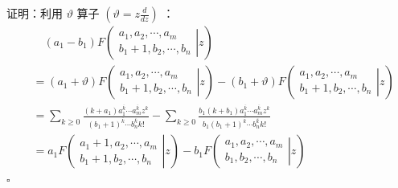 证明：利用 \( \vartheta \) 算子 \( (\vartheta = z \frac{d}{dz}) \) ：
\begin{align*}
  & \quad (a_1 - b_1) F
  \left( \left.
    \begin{array}{cccc}
      a_1, a_2, \cdots, a_m \\
      b_1+1, b_2, \cdots, b_n
  \end{array} \right|{z} \right) \\[5pt]
  &= (a_1 + \vartheta) F
  \left( \left.
    \begin{array}{cccc}
      a_1, a_2, \cdots, a_m \\
      b_1+1, b_2, \cdots, b_n
  \end{array} \right|{z} \right) -
  (b_1 + \vartheta) F
  \left( \left.
    \begin{array}{cccc}
      a_1, a_2, \cdots, a_m \\
      b_1+1, b_2, \cdots, b_n
  \end{array} \right|{z} \right) \\[5pt]
  &= \sum_{k \ge 0} \frac{(k + a_1) a_1^{\overline{k}} \cdots a_m^{\overline{k}} z^k}{(b_1+1)^{\overline{k}} \cdots b_n^{\overline{k}} k!} - \sum_{k \ge 0} \frac{b_1 (k + b_1) a_1^{\overline{k}} \cdots a_m^{\overline{k}} z^k}{b_1 (b_1+1)^{\overline{k}} \cdots b_n^{\overline{k}} k!} \\[5pt]
  &= a_1 F
  \left( \left.
    \begin{array}{cccc}
      a_1 + 1, a_2, \cdots, a_m \\
      b_1+1, b_2, \cdots, b_n
  \end{array} \right|{z} \right) -
  b_1 F
  \left( \left.
    \begin{array}{cccc}
      a_1, a_2, \cdots, a_m \\
      b_1, b_2, \cdots, b_n
  \end{array} \right|{z} \right)
\end{align*}
\hfill \( \square \)

